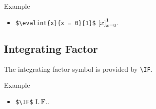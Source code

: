 \begin{myframe}{Example }
    \begin{itemize}
        \item \verb|$\evalint{x}{x = 0}{1}$| \produces{} $\displaystyle\left[x\right]_{x = 0}^{1}$.
    \end{itemize}
\end{myframe}

\subsection{Integrating Factor}

The integrating factor symbol is provided by \verb|\IF|.

\begin{myframe}{Example }
    \begin{itemize}
        \item \verb|$\IF$| \produces{} $\operatorname{I.F.}$.
    \end{itemize}
\end{myframe}